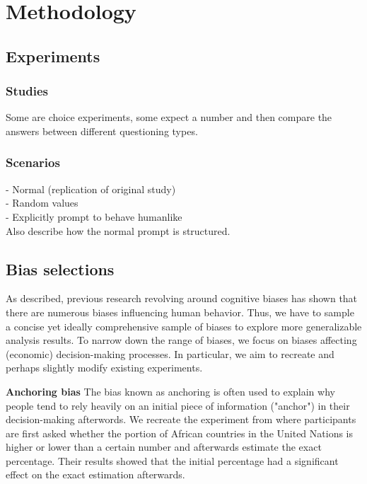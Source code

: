 \section{Methodology}

\subsection{Experiments}
\subsubsection{Studies}
Some are choice experiments, some expect a number and then compare the answers between different questioning types.

\subsubsection{Scenarios}
- Normal (replication of original study) \\
- Random values \\
- Explicitly prompt to behave humanlike \\

Also describe how the normal prompt is structured.


\subsection{Bias selections}
\par As described, previous research revolving around cognitive biases has shown that there are numerous biases influencing human behavior. Thus, we have to sample a concise yet ideally comprehensive sample of biases to explore more generalizable analysis results. To narrow down the range of biases, we focus on biases affecting (economic) decision-making processes. In particular, we aim to recreate and perhaps slightly modify existing experiments.

\setlength{\parindent}{20pt}
\par \textbf{Anchoring bias} The bias known as anchoring is often used to explain why people tend to rely heavily on an initial piece of information ("anchor") in their decision-making afterwords. We recreate the experiment from \textcite{tversky1974judgment} where participants are first asked whether the portion of African countries in the United Nations is higher or lower than a certain number and afterwards estimate the exact percentage. Their results showed that the initial percentage had a significant effect on the exact estimation afterwards.

